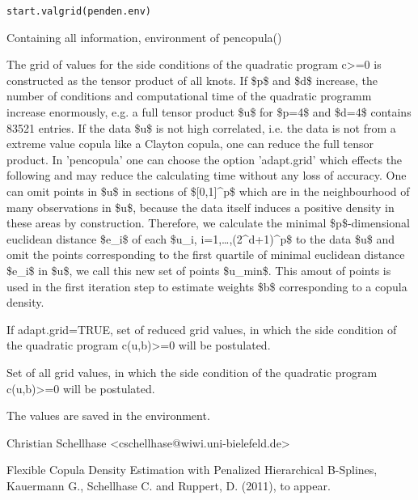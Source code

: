 \documentclass[a4paper]{book}
\begin{document}
%
\begin{Usage}
\begin{verbatim}
start.valgrid(penden.env)
\end{verbatim}
\end{Usage}
%
\begin{Arguments}
\begin{ldescription}
\item[\code{penden.env}] Containing all information, environment of pencopula()
\end{ldescription}
\end{Arguments}
%
\begin{Details}\relax
The grid of values for the side conditions of the quadratic
program c>=0 is constructed as the tensor product of all knots. If \$p\$
and \$d\$ increase, the number of conditions and computational time of
the quadratic programm increase enormously, e.g. a full tensor product
\$u\$ for \$p=4\$ and \$d=4\$ contains 83521 entries. If the data
\$u\$ is not high correlated, i.e. the data is not from a extreme
value copula like a Clayton copula, one can reduce the full tensor
product. In 'pencopula' one can choose the option
'adapt.grid' which effects the following and may reduce the
calculating time without any loss of accuracy. One can omit points in
\$u\$ in sections of \$[0,1]\textasciicircum{}p\$ which are in the neighbourhood
of many observations in \$u\$, because the data itself induces a
positive density in these areas by construction. Therefore, we
calculate the minimal \$p\$-dimensional euclidean distance \$e\_i\$
of each \$u\_i, i=1,\dots,(2\textasciicircum{}d+1)\textasciicircum{}p\$ to the data \$u\$ and omit the points
corresponding to the first quartile of minimal euclidean distance
\$e\_i\$ in \$u\$, we call this new set of points
\$u\_min\$. This amout of points is used in the first
iteration step to estimate weights \$b\$ corresponding to a copula
density.
\end{Details}
%
\begin{Value}
\begin{ldescription}
\item[\code{X.knots.g}] If adapt.grid=TRUE, set of reduced grid values, in which the side condition of
the quadratic program c(u,b)>=0 will be postulated.
\item[\code{X.knots.g.all}] Set of all grid values, in which the side condition of
the quadratic program c(u,b)>=0 will be postulated.
\end{ldescription}
The values are saved in the environment.
\end{Value}
%
\begin{Author}\relax
Christian Schellhase <cschellhase@wiwi.uni-bielefeld.de>
\end{Author}
%
\begin{References}\relax
Flexible Copula Density Estimation with Penalized
Hierarchical B-Splines, Kauermann G., Schellhase C. and Ruppert, D. (2011), to appear.
\end{References}
\printindex{}
\end{document}
